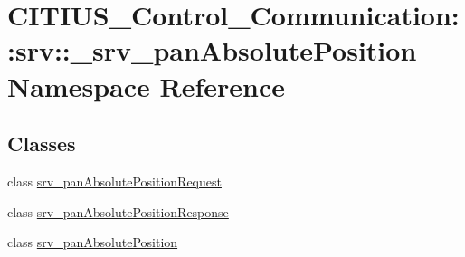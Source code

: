\hypertarget{namespace_c_i_t_i_u_s___control___communication_1_1srv_1_1__srv__pan_absolute_position}{\section{\-C\-I\-T\-I\-U\-S\-\_\-\-Control\-\_\-\-Communication\-:\-:srv\-:\-:\-\_\-srv\-\_\-pan\-Absolute\-Position \-Namespace \-Reference}
\label{namespace_c_i_t_i_u_s___control___communication_1_1srv_1_1__srv__pan_absolute_position}
}
\subsection*{\-Classes}
\begin{DoxyCompactItemize}
\item 
class \hyperlink{class_c_i_t_i_u_s___control___communication_1_1srv_1_1__srv__pan_absolute_position_1_1srv__pan_absolute_position_request}{srv\-\_\-pan\-Absolute\-Position\-Request}
\item 
class \hyperlink{class_c_i_t_i_u_s___control___communication_1_1srv_1_1__srv__pan_absolute_position_1_1srv__pan_absolute_position_response}{srv\-\_\-pan\-Absolute\-Position\-Response}
\item 
class \hyperlink{class_c_i_t_i_u_s___control___communication_1_1srv_1_1__srv__pan_absolute_position_1_1srv__pan_absolute_position}{srv\-\_\-pan\-Absolute\-Position}
\end{DoxyCompactItemize}
